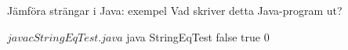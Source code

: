 \begin{Slide}{Jämföra strängar i Java: exempel}\SlideFontSmall
Vad skriver detta Java-program ut?
\pause
\begin{REPL}
$ javac StringEqTest.java
$ java StringEqTest
false
true
0
\end{REPL}
\end{Slide}











